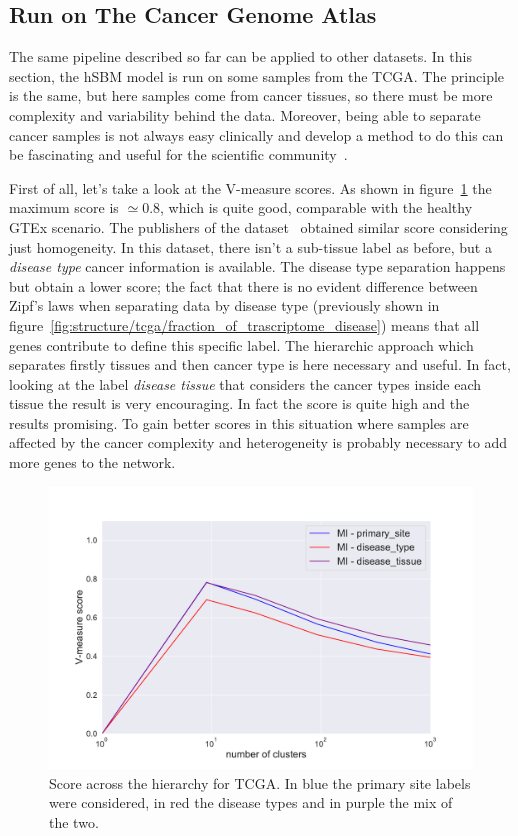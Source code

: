 \subsection{Run on The Cancer Genome Atlas}
The same pipeline described so far can be applied to other datasets. In this section, the hSBM model is run on some samples from the TCGA. The principle is the same, but here samples come from cancer tissues, so there must be more complexity and variability behind the data. Moreover, being able to separate cancer samples is not always easy clinically and develop a method to do this can be fascinating and useful for the scientific community~\cite{Farver2018}. 

First of all, let's take a look at the V-measure scores. As shown in figure~\ref{fig:topic/tcga/metric} the maximum score is $\simeq 0.8$, which is quite good, comparable with the healthy GTEx scenario. The publishers of the dataset~\cite{Farver2018} obtained similar score considering just homogeneity. In this dataset, there isn't a sub-tissue label as before, but a \textit{disease type} cancer information is available. The disease type separation happens but obtain a lower score; the fact that there is no evident difference between Zipf's laws when separating data by disease type (previously shown in figure~\ref{fig:structure/tcga/fraction_of_trascriptome_disease}) means that all genes contribute to define this specific label. The hierarchic approach which separates firstly tissues and then cancer type is here necessary and useful. In fact, looking at the label \textit{disease tissue} that considers the cancer types inside each tissue the result is very encouraging. In fact the score is quite high and the results promising. To gain better scores in this situation where samples are affected by the cancer complexity and heterogeneity is probably necessary to add more genes to the network. 
\begin{figure}[htb!]
    \centering
    \includegraphics[width=0.85\linewidth]{pictures/topic/tcga/metric.pdf}
    \caption{Score across the hierarchy for TCGA. In blue the primary site labels were considered, in red the disease types and in purple the mix of the two.}
    \label{fig:topic/tcga/metric}
\end{figure}
